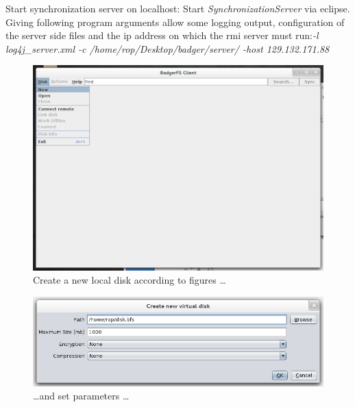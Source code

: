 Start synchronization server on localhost: Start
\textit{SynchronizationServer} via eclipse. Giving following program arguments
allow some logging output, configuration of the server side files and
the ip address on which the rmi server must run:\newline \textit{-l
log4j\_server.xml -c /home/rop/Desktop/badger/server/ -host 129.132.171.88}



\begin{figure}[h!]
\centering
\includegraphics[width=1\textwidth]{figures/serverUseCase/01_newDisk.png}
\caption{Create a new local disk according to figures \ldots}
\label{fig:01_newDisk.png}
\end{figure}

\begin{figure}[h!]
\centering
\includegraphics[width=1\textwidth]{figures/serverUseCase/02_newDisk2.png}
\caption{\ldots and set parameters \ldots}
\label{fig:02_newDisk2.png}
\end{figure}

